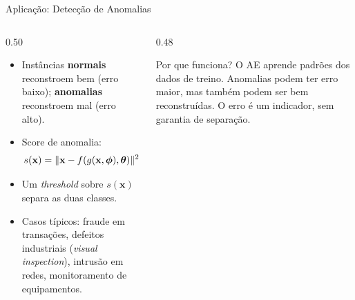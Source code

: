 \documentclass[aspectratio=169,xcolor=dvipsnames]{beamer}
\begin{document}
  \begin{frame}{Aplicação: Detecção de Anomalias}
    \begin{columns}[T]
      \begin{column}{0.50\textwidth}
        \begin{itemize}
          \item Instâncias \textbf{normais} reconstroem bem (erro baixo);
          \textbf{anomalias} reconstroem mal (erro alto).
          \item Score de anomalia:
          \[
            s(\mathbf{x}) = \lVert \mathbf{x} - f(g(\mathbf{x},\bm{\phi}),\bm{\theta}) \rVert^{2}
          \]
          \item Um \textit{threshold} sobre $s(\mathbf{x})$ separa as duas classes.
          \item Casos típicos: fraude em transações, defeitos industriais
          (\textit{visual inspection}), intrusão em redes, monitoramento
          de equipamentos.
        \end{itemize}
      \end{column}
      \begin{column}{0.48\textwidth}
        \centering
        \vspace{0.2em}
        \begin{alertblock}{Por que funciona?}
          \scriptsize O AE aprende padrões dos dados de treino.
          Anomalias podem ter erro maior, mas também podem ser bem
          reconstruídas. O erro é um indicador, sem garantia de separação.
        \end{alertblock}
      \end{column}
    \end{columns}
  \end{frame}
\end{document}
